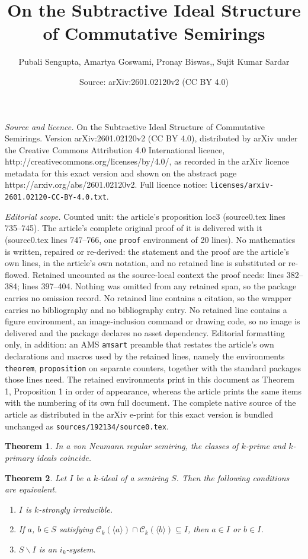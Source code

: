 \documentclass[10pt,a4paper]{amsart}
\title{On the Subtractive Ideal Structure of Commutative Semirings}
\author{Pubali Sengupta, Amartya Goswami, Pronay Biswas,, Sujit Kumar Sardar}
\date{Source: arXiv:2601.02120v2 (CC BY 4.0)}
\newtheorem{theorem}{Theorem}
\begin{document}
\maketitle

\noindent\emph{Source and licence.} On the Subtractive Ideal Structure of Commutative Semirings. Version arXiv:2601.02120v2 (CC BY 4.0), distributed by arXiv under the Creative Commons Attribution 4.0 International licence, http://creativecommons.org/licenses/by/4.0/, as recorded in the arXiv licence metadata for this exact version and shown on the abstract page https://arxiv.org/abs/2601.02120v2. Full licence notice: \texttt{licenses/arxiv-2601.02120-CC-BY-4.0.txt}.\par\smallskip

\noindent\textit{Editorial scope.} Counted unit: the article's proposition loc3 (source0.tex lines 735--745). The article's complete original proof of it is delivered with it (source0.tex lines 747--766, one \texttt{proof} environment of 20 lines). No mathematics is written, repaired or re-derived: the statement and the proof are the article's own lines, in the article's own notation, and no retained line is substituted or re-flowed.  Retained uncounted as the source-local context the proof needs: lines 382--384; lines 397--404.  Nothing was omitted from any retained span, so the package carries no omission record.  No retained line contains a citation, so the wrapper carries no bibliography and no bibliography entry.  No retained line contains a figure environment, an image-inclusion command or drawing code, so no image is delivered and the package declares no asset dependency.  Editorial formatting only, in addition: an AMS \texttt{amsart} preamble that restates the article's own declarations and macros used by the retained lines, namely the environments \texttt{theorem}, \texttt{proposition} on separate counters, together with the standard packages those lines need.  The retained environments print in this document as Theorem 1, Proposition 1 in order of appearance, whereas the article prints the same items with the numbering of its own full document.  The complete native source of the article as distributed in the arXiv e-print for this exact version is bundled unchanged as \texttt{sources/192134/source0.tex}.
\begin{theorem}\label{loc14}
    In a von Neumann regular semiring, the classes of $k$-prime and $k$-primary ideals coincide.
\end{theorem}

\begin{theorem}\label{loc11}
    Let $I$ be a $k$-ideal of a semiring $S$. Then the following conditions are equivalent.
    \begin{enumerate}
        \item $I$ is $k$-strongly irreducible.
        \item If $a$, $b \in S$ satisfying $\mathcal{C}_k(\langle a\rangle) \cap \mathcal{C}_k(\langle b\rangle) \subseteq I$, then $a \in I$ or $b \in I$.
        \item $S\backslash I$ is an $i_k$-system.
    \end{enumerate}
\end{theorem}
\end{document}
